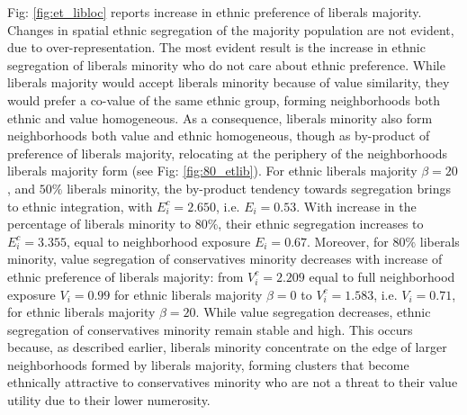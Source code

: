 \documentclass{article}
\begin{document}
Fig: \ref{fig:et_libloc} reports increase in ethnic preference of liberals majority. Changes in spatial ethnic segregation of the majority population are not evident, due to over-representation. The most evident result is the increase in ethnic segregation of liberals minority who do not care about ethnic preference. While liberals majority would accept liberals minority because of value similarity, they would prefer a co-value of the same ethnic group, forming neighborhoods both ethnic and value homogeneous. As a consequence, liberals minority also form neighborhoods both value and ethnic homogeneous, though as by-product of preference of liberals majority, relocating at the periphery of the neighborhoods liberals majority form (see Fig: \ref{fig:80_etlib}). For ethnic liberals majority $\beta = 20$, and $50 \%$ liberals minority, the by-product tendency towards segregation brings to ethnic integration, with $E^c_i = 2.650$, i.e. $E_i = 0.53$. With increase in the percentage of liberals minority to $80 \%$, their ethnic segregation increases to $E^c_i = 3.355$, equal to neighborhood exposure $E_i = 0.67$. Moreover, for $80 \%$ liberals minority, value segregation of conservatives minority decreases with increase of ethnic preference of liberals majority: from $V^c_i = 2.209$ equal to full neighborhood exposure $V_i = 0.99$ for ethnic liberals majority $\beta = 0$ to $V^c_i =1.583$, i.e. $V_i = 0.71$, for ethnic liberals majority $\beta = 20$. While value segregation decreases, ethnic segregation of conservatives minority remain stable and high. This occurs because, as described earlier, liberals minority concentrate on the edge of larger neighborhoods formed by liberals majority, forming clusters that become ethnically attractive to conservatives minority who are not a threat to their value utility due to their lower numerosity. 
\end{document}
